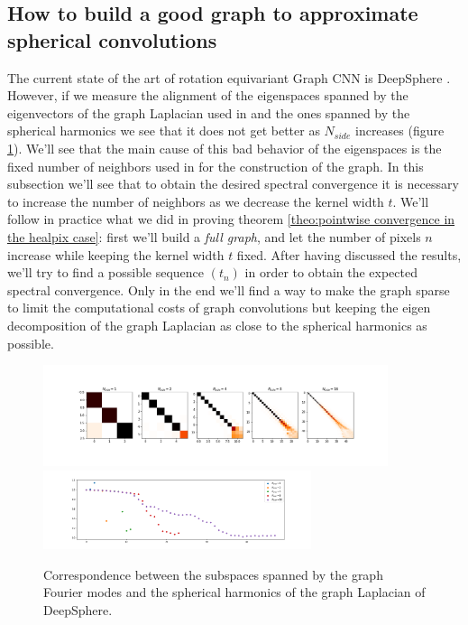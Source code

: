 \clearpage
\subsection{How to build a good graph to approximate spherical convolutions}
\label{sec:Chapter2:How to build a good graph}
The current state of the art of rotation equivariant Graph CNN is DeepSphere \cite{DeepSphere}. However, if we measure the alignment of the eigenspaces spanned by the eigenvectors of the graph Laplacian used in \cite{DeepSphere} and the ones spanned by the spherical harmonics we see that it does not get better as $N_{side}$ increases (figure \ref{fig:deepsphere results}). We'll see that the main cause of this bad behavior of the eigenspaces is the fixed number of neighbors used in \cite{DeepSphere} for the construction of the graph. In this subsection we'll see that to obtain the desired spectral convergence it is necessary to increase the number of neighbors as we decrease the kernel width $t$. We'll follow in practice what we did in proving theorem \ref{theo:pointwise convergence in the healpix case}: first we'll build a \textit{full graph}, and let the number of pixels $n$ increase while keeping the kernel width $t$ fixed. After having discussed the results, we'll try to find a possible sequence $(t_n)$ in order to obtain the expected spectral convergence. Only in the end we'll find a way to make the graph sparse to limit the computational costs of graph convolutions but keeping the eigen decomposition of the graph Laplacian as close to the spherical harmonics as possible.
\begin{figure}[h!]
	\centering
	\includegraphics[width=0.9\textwidth]{../codes/02.HeatKernelGraphLaplacian/HEALPix/06_figures/deepsphere_original.png}
		\includegraphics[width=0.7\textwidth]{../codes/02.HeatKernelGraphLaplacian/HEALPix/06_figures/deepsphere_original_diagonal.png}	
		\caption{\label{fig:deepsphere results}Correspondence between the subspaces spanned by the graph Fourier modes and the spherical harmonics of the graph Laplacian of DeepSphere.}
\end{figure}

